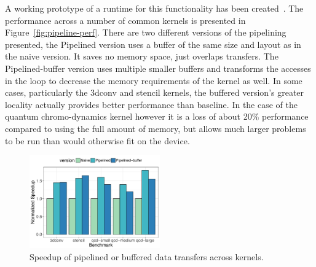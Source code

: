 A working prototype of a runtime for this functionality has been
created~\cite{cui2017directive}. The performance across a number of common
kernels is presented in Figure~\ref{fig:pipeline-perf}.  There are two different
versions of the pipelining presented, the Pipelined version uses a buffer of the
same size and layout as in the naive version.  It saves no memory space, just
overlaps transfers.  The Pipelined-buffer version uses multiple smaller buffers
and transforms the accesses in the loop to decrease the memory requirements of
the kernel as well.  In some cases, particularly the 3dconv and stencil kernels,
the buffered version's greater locality actually provides better performance
than baseline. In the case of the quantum chromo-dynamics kernel however it is a
loss of about 20\% performance compared to using the full amount of memory, but
allows much larger problems to be run than would otherwise fit on the device.

\begin{figure}
  \centering
  \includegraphics[width=0.5\textwidth]{pics/pipelining-perf}
  \caption{Speedup of pipelined or buffered data transfers across kernels.\label{pipeline-perf}}
\end{figure}

